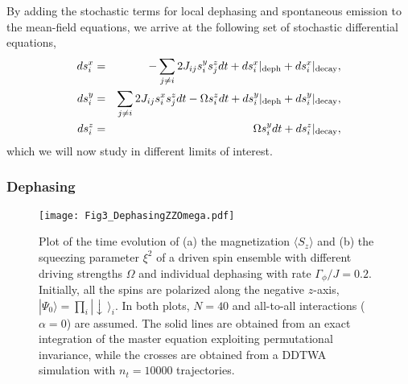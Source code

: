 \documentclass[pra,twocolumn,showpacs,preprintnumbers,amsmath,amssymb,superscriptaddress]{revtex4-1}
\newcommand{\ket}[1]{|#1\rangle}
\newcommand{\erw}[1]{\langle#1\rangle}
\newcommand{\abs}[1]{\lvert#1\rvert}
\begin{document}
By adding the stochastic terms for local dephasing and spontaneous emission to the mean-field equations, we arrive at the following set of stochastic differential equations,
\begin{eqnarray}
ds_i^x&=&-\sum_{j\neq i} 2J_{ij} s_i^y s_j^z dt+ds_i^x|_{\rm deph}+ds_i^x|_{\rm decay},\\
ds_i^y&=& \sum_{j\neq i} 2J_{ij} s_i^x s_j^z  dt - \Omega s_i^z dt+ds_i^y|_{\rm deph}+ds_i^y|_{\rm decay},\\
ds_i^z&=& \Omega s_i^y dt+ds_i^z|_{\rm decay},
\end{eqnarray}
which we will now study in different limits of interest.






\subsubsection{Dephasing}

 \begin{figure}[t]
	\centering
	\texttt{[image: Fig3\_DephasingZZOmega.pdf]}
	\caption{Plot of the time evolution of (a) the magnetization $\erw{S_z}$ and (b) the squeezing parameter $\xi^2$ of a driven spin ensemble with different driving strengths $\Omega$ and individual dephasing with rate $\Gamma_{\phi}/J=0.2$. Initially, all the spins are polarized along the negative $z$-axis, $|\Psi_0\rangle=\prod_i |\downarrow\,\rangle_i$. In both plots, $N=40$ and  all-to-all interactions ($\alpha=0$) are assumed. The solid lines are obtained from an exact integration of the master equation exploiting permutational invariance, while the crosses are obtained from a DDTWA simulation with $n_t=10000$ trajectories.}
	\label{fig:ZZDephasingOmega}
\end{figure}
\end{document}
